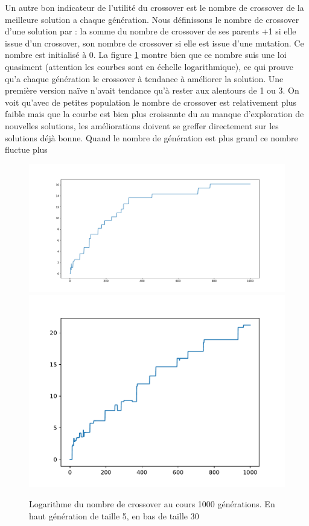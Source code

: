 \documentclass[10pt,a4paper]{article}
\begin{document}
Un autre bon indicateur de l'utilité du crossover est le nombre de crossover de la meilleure solution a chaque génération. Nous définissons le nombre de crossover d'une solution par : la somme du nombre de crossover de ses parents +1 si elle issue d'un crossover, son nombre de crossover si elle est issue d'une mutation. Ce nombre est initialisé à 0. La figure \ref{nbcrossover} montre bien que ce nombre suis une loi quasiment (attention les courbes sont en échelle logarithmique), ce qui prouve qu'a chaque génération le crossover à tendance à améliorer la solution. Une première version naïve n'avait tendance qu'à rester aux alentours de 1 ou 3. On voit qu'avec de petites population le nombre de crossover est relativement plus faible mais que la courbe est bien plus croissante du au manque d'exploration de nouvelles solutions, les améliorations doivent se greffer directement sur les solutions déjà bonne. Quand le nombre de génération est plus grand ce nombre fluctue plus 

\begin{figure}
\centering
\includegraphics[scale=.4]{images/nombre_fusion_log_5_1000.pdf}
\includegraphics[scale=.6]{images/nombre_fusion_log_30_1000.pdf}
\caption{Logarithme du nombre de crossover au cours 1000 générations. En haut génération de taille 5, en bas de taille 30}
\label{nbcrossover}
\end{figure}
\end{document}
